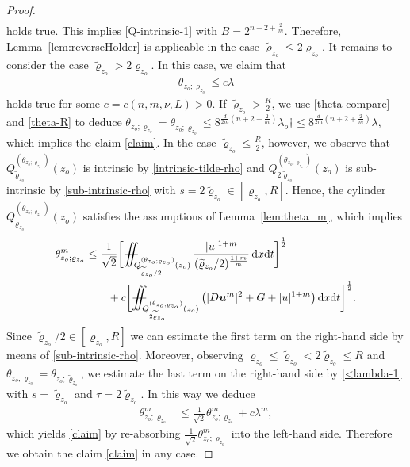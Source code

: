\documentclass[a4paper, 10pt, american]{amsart}
\numberwithin{theorem}{section}
\numberwithin{equation}{section}
\newcommand{\dxdt}{\,\mathrm{d}x\mathrm{d}t}
\renewcommand{\rho}{\varrho}
\newcommand{\power}[2]{\bm{#1^{\mbox{\unboldmath{\scriptsize$#2$}}}}}
\def\Xiint#1{\mathchoice
    {\XXiint\displaystyle\textstyle{#1}}%
    {\XXiint\textstyle\scriptstyle{#1}}%
    {\XXiint\scriptstyle\scriptscriptstyle{#1}}%
    {\XXiint\scriptscriptstyle\scriptscriptstyle{#1}}%
    \!\iint}
\def\XXiint#1#2#3{\setbox0=\hbox{$#1{#2#3}{\iint}$}
    \vcenter{\hbox{$#2#3$}}\kern-0.5\wd0}
\def\biint{\Xiint{-\!-}}
\def\Tilde{\widetilde}
\begin{document}
\begin{proof}
\begin{align}
\end{align}
holds true. 
This implies \eqref{Q-intrinsic-1} with
$B=2^{n+2+\frac2m}$. Therefore, Lemma~\ref{lem:reverseHolder} is
applicable in the case $\Tilde\rho_{z_o}\le 2\rho_{z_o}$.
It remains to consider the case $\Tilde\rho_{z_o}>2\rho_{z_o}$.
In this case, we claim that 
\begin{align}\label{claim}
\theta_{z_o;\rho_{z_o}}\le c\lambda
\end{align}
holds true for some $c=c(n,m,\nu,L)>0.$
If $\Tilde\rho_{z_o}>\frac R2$, we use \eqref{theta-compare} and
\eqref{theta-R} to deduce
$
\theta_{z_o;\rho_{z_o}}
=
\theta_{z_o;\Tilde\rho_{z_o}}\le8^{\frac{d}{2m}(n+2+\frac2m)}\lambda_o†
\le
8^{\frac{d}{2m}(n+2+\frac2m)}\lambda,
$
which implies the claim \eqref{claim}.
In the case $\Tilde\rho_{z_o}\le\frac R2$, however, we observe 
that $Q_{\Tilde\rho_{z_o}}^{(\theta_{z_o;\rho_{z_o}})}(z_o)$ is
intrinsic by \eqref{intrinsic-tilde-rho} and
$Q_{2\Tilde\rho_{z_o}}^{(\theta_{z_o;\rho_{z_o}})}(z_o)$ is
sub-intrinsic by \eqref{sub-intrinsic-rho} with $s=2\Tilde\rho_{z_o}\in[\rho_{z_o},R]$.  
Hence, the cylinder
$Q_{\Tilde\rho_{z_o}}^{(\theta_{z_o;\rho_{z_o}})}(z_o)$ satisfies the
assumptions of Lemma~\ref{lem:theta_m}, which implies
\begin{align}
\nonumber
\theta_{z_o;\rho_{z_o}}^m
&\le
\frac1{\sqrt2}\bigg[\biint_{Q_{\Tilde\rho_{z_o}/2}^{(\theta_{z_o;\rho_{z_o}})}(z_o)} \frac{|u|^{1+m}}{(\Tilde\rho_{z_o}/2)^\frac{1+m}m}\dxdt\bigg]^{\frac12} \\
&\qquad+
c\bigg[ \biint_{Q_{2\Tilde\rho_{z_o}}^{(\theta_{z_o;\rho_{z_o}})}(z_o)} \big(|D\power um|^2 +G + |u|^{1+m} \big)\dxdt\bigg]^{\frac12}.
\end{align}
Since $\Tilde\rho_{z_o}/2\in[\rho_{z_o},R]$ we can estimate the first term
on the right-hand side by means of \eqref{sub-intrinsic-rho}. Moreover,
observing $\rho_{z_o}\le\Tilde\rho_{z_o}<2\Tilde\rho_{z_o}\le R$ and
$\theta_{z_o;\rho_{z_o}}=\theta_{z_o;\Tilde\rho_{z_o}}$, we estimate the last term on the right-hand side by
\eqref{<lambda-1} with $s=\Tilde\rho_{z_o}$ and
$\tau=2\Tilde\rho_{z_o}$. In this
way we deduce
\begin{align}
\theta_{z_o;\rho_{z_o}}^m
&\le
\frac1{\sqrt2}\theta_{z_o;\rho_{z_o}}^m
+
c\lambda^m,
\end{align}
which yields \eqref{claim} by re-absorbing $\frac1{\sqrt2}\theta_{z_o;\rho_{z_o}}^m$ into the left-hand side.
Therefore we obtain the claim \eqref{claim} in any case.


\end{proof}
\end{document}
